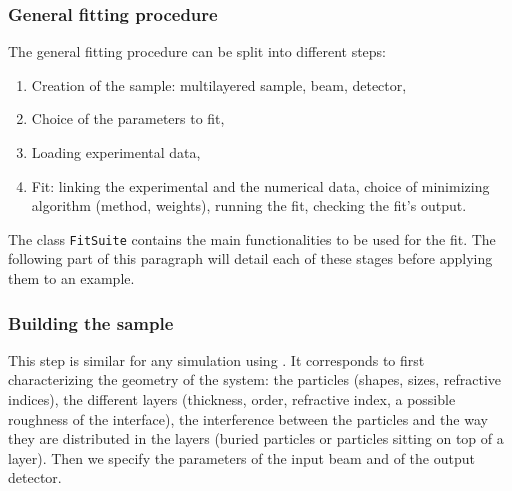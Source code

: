 \subsubsection{General fitting procedure}

The general fitting procedure can be split into different steps:
\begin{enumerate}
\item Creation of the sample: multilayered sample, beam, detector,
\item Choice of the parameters to fit,
\item Loading experimental data,
\item Fit: linking the experimental and the numerical data, choice of
  minimizing algorithm (method, weights), running the fit, checking the fit's output.
\end{enumerate}

The class \texttt{FitSuite} contains the main functionalities to be used
for the fit. The following part of this paragraph will detail each of
these stages before applying them to an example.


\subsubsection{Building the sample}
This step is similar for any simulation using \BornAgain. It
corresponds to first characterizing  the geometry of the system: the particles (shapes, sizes, refractive
indices), the different layers (thickness,
order, refractive index, a possible roughness of the interface), the
interference between the particles and the way they are distributed in
the layers (buried particles or particles sitting on top of a
layer). Then we specify the parameters of the input beam and of the
output detector.

